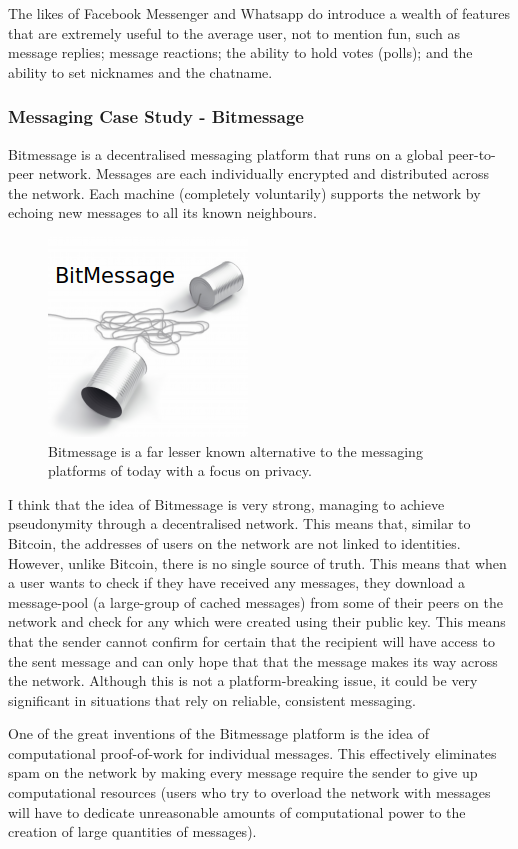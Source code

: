 \documentclass{article}
\begin{document}
The likes of Facebook Messenger and Whatsapp do introduce a wealth of features that are extremely useful to the average user, not to mention fun, such as message replies; message reactions; the ability to hold votes (polls); and the ability to set nicknames and the chatname.

\subsubsection{Messaging Case Study - Bitmessage}
Bitmessage\cite{bitmessage_paper} is a decentralised messaging platform that runs on a global peer-to-peer network. Messages are each individually encrypted and distributed across the network. Each machine (completely voluntarily) supports the network by echoing new messages to all its known neighbours.
\begin{figure}[h]
    \centering
    \includegraphics[width=0.4\linewidth]{Images/bitmessagelogo}
    \caption{Bitmessage is a far lesser known alternative to the messaging platforms of today with a focus on privacy.}
    \label{fig:bitmessagelogo}
\end{figure}
I think that the idea of Bitmessage is very strong, managing to achieve pseudonymity through a decentralised network. This means that, similar to Bitcoin, the addresses of users on the network are not linked to identities. However, unlike Bitcoin, there is no single source of truth. This means that when a user wants to check if they have received any messages, they download a message-pool (a large-group of cached messages) from some of their peers on the network and check for any which were created using their public key. This means that the sender cannot confirm for certain that the recipient will have access to the sent message and can only hope that that the message makes its way across the network. Although this is not a platform-breaking issue, it could be very significant in situations that rely on reliable, consistent messaging.

One of the great inventions of the Bitmessage platform is the idea of computational proof-of-work for individual messages. This effectively eliminates spam on the network by making every message require the sender to give up computational resources (users who try to overload the network with messages will have to dedicate unreasonable amounts of computational power to the creation of large quantities of messages).
\end{document}
